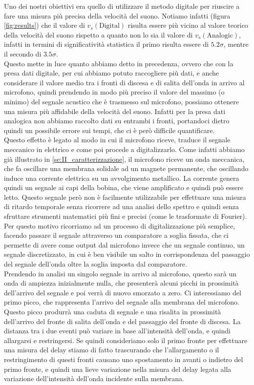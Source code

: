 \documentclass[
    rmp,
    reprint, 
    superscriptaddress, 
    altaffilletter, 
    amsmath, 
    amssymb, 
    a4paper,
    varvw]{revtex4-2}
\begin{document}
Uno dei nostri obiettivi era quello di utilizzare il metodo digitale per riuscire a fare una misura più precisa della velocità del suono. Notiamo infatti (figura \ref{fig:results}) che il valore di $v_s(\text{Digital})$ risulta essere più vicino al valore teorico della velocità del suono rispetto a quanto non lo sia il valore di $v_s(\text{Analogic})$, infatti in termini di significatività statistica il primo risulta essere di $5.2\sigma$, mentre il secondo di $3.5\sigma$. \\
Questo mette in luce quanto abbiamo detto in precedenza, ovvero che con la presa dati digitale, per cui abbiamo potuto raccogliere più dati, e anche considerare il valore medio tra i fronti di discesa e di salita dell'onda in arrivo al microfono, quindi prendendo in modo più preciso il valore del massimo (o minimo) del segnale acustico che è trasmesso sul microfono, possiamo ottenere una misura più affidabile della velocità del suono. Infatti per la presa dati analogica non abbiamo raccolto dati su entrambi i fronti, portandoci dietro quindi un possibile errore sui tempi, che ci è però difficile quantificare. \\
Questo effetto è legato al modo in cui il microfono riceve, traduce il segnale meccanico in elettrico e come poi procede a digitalizzarlo. Come infatti abbiamo già illustrato in \ref{se:II_caratterizzazione}, il microfono riceve un onda meccanica, che fa oscillare una membrana solidale ad un magnete permanente, che oscillando induce una corrente elettrica su un avvolgimento metallico. La corrente genera quindi un segnale ai capi della bobina, che viene amplificato e quindi può essere letto. Questo segnale però non è facilmente utilizzabile per effettuare una misura di ritardo temporale senza ricorrere ad una analisi dello spettro e quindi senza sfruttare strumenti matematici più fini e precisi (come le trasformate di Fourier). Per questo motivo ricorriamo ad un processo di digitalizzazione più semplice, facendo passare il segnale attraverso un comparatore a soglia fissata, che ci permette di avere come output dal microfono invece che un segnale continuo, un segnale discretizzato, in cui è ben visibile un salto in corrispondenza del passaggio del segnale dell'onda oltre la soglia imposta dal comparatore. \\
Prendendo in analisi un singolo segnale in arrivo al microfono, questo sarà un onda di ampiezza inizialmente nulla, che presenterà alcuni picchi in prossimità dell'arrivo del segnale e poi verrà di nuovo smorzato a zero. Ci interessiamo del primo picco, che rappresenta l'arrivo del segnale alla membrana del microfono. Questo picco produrrà una caduta di segnale e una risalita in prossimità dell'arrivo del fronte di salita dell'onda e del passaggio del fronte di discesa. La distanza tra i due eventi può variare in base all'intensità dell'onda, e quindi allargarsi e restringersi. Se quindi consideriamo solo il primo fronte per effettuare una misura del delay stiamo di fatto trascurando che l'allargamento o il restringimento di questi fronti causano uno spostamento in avanti o indietro del primo fronte, e quindi una lieve variazione nella misura del delay legata alla variazione dell'intensità dell'onda incidente sulla membrana. \\
\end{document}
